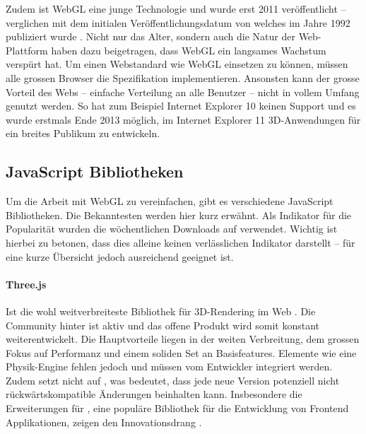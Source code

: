 Zudem ist WebGL eine junge Technologie und wurde erst 2011 veröffentlicht – verglichen mit dem initialen Veröffentlichungsdatum von  welches im Jahre 1992 publiziert wurde \cite{webGl1Spec,openGlSpec}.
Nicht nur das Alter, sondern auch die Natur der Web-Plattform haben dazu beigetragen, dass WebGL ein langsames Wachstum verspürt hat. Um einen Webstandard wie WebGL einsetzen zu können, müssen alle grossen Browser die Spezifikation implementieren. Ansonsten kann der grosse Vorteil des Webs – einfache Verteilung an alle Benutzer – nicht in vollem Umfang genutzt werden. So hat zum Beispiel Internet Explorer 10 keinen Support und es wurde erstmals Ende 2013 möglich, im Internet Explorer 11 3D-Anwendungen für ein breites Publikum zu entwickeln.

\subsection{JavaScript Bibliotheken}
Um die Arbeit mit WebGL zu vereinfachen, gibt es verschiedene JavaScript Bibliotheken. Die Bekanntesten werden hier kurz erwähnt. Als Indikator für die Popularität wurden die wöchentlichen Downloads auf  verwendet. Wichtig ist hierbei zu betonen, dass dies alleine keinen verlässlichen Indikator darstellt – für eine kurze Übersicht jedoch ausreichend geeignet ist.

\paragraph{Three.js}
Ist die wohl weitverbreiteste Bibliothek für 3D-Rendering im Web \cite{threeNpmPackage}.
Die Community hinter  ist aktiv und das offene Produkt wird somit konstant weiterentwickelt.
Die Hauptvorteile liegen in der weiten Verbreitung, dem grossen Fokus auf Performanz und einem soliden Set an Basisfeatures. Elemente wie eine Physik-Engine fehlen jedoch und müssen vom Entwickler integriert werden. Zudem setzt  nicht auf , was bedeutet, dass jede neue Version potenziell nicht rückwärtskompatible Änderungen beinhalten kann.
Insbesondere die Erweiterungen für , eine populäre Bibliothek für die Entwicklung von Frontend Applikationen, zeigen den Innovationsdrang \cite{threeFiberGithub, reactNpmPackage}.


